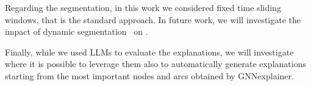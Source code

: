 


Regarding the segmentation, in this work we considered fixed time sliding windows, that is the standard approach. In future work, we will investigate the impact of dynamic segmentation~\cite{aminikhanghahi2017using} on \acronym{}.

Finally, while we used LLMs to evaluate the explanations, we will investigate where it is possible to leverage them also to automatically generate explanations starting from the most important nodes and arcs obtained by GNNexplainer.

